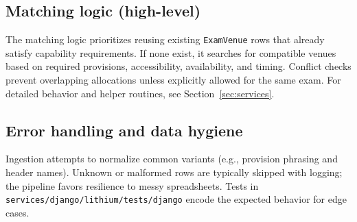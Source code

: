 \subsection{Matching logic (high-level)}
\label{subsec:ingestion:matching}

The matching logic prioritizes reusing existing \texttt{ExamVenue} rows that already satisfy capability requirements. If none exist, it searches for compatible venues based on required provisions, accessibility, availability, and timing. Conflict checks prevent overlapping allocations unless explicitly allowed for the same exam. For detailed behavior and helper routines, see Section~\ref{sec:services}.

\subsection{Error handling and data hygiene}
\label{subsec:ingestion:errors}

Ingestion attempts to normalize common variants (e.g., provision phrasing and header names). Unknown or malformed rows are typically skipped with logging; the pipeline favors resilience to messy spreadsheets. Tests in \texttt{services/django/lithium/tests/django} encode the expected behavior for edge cases.
